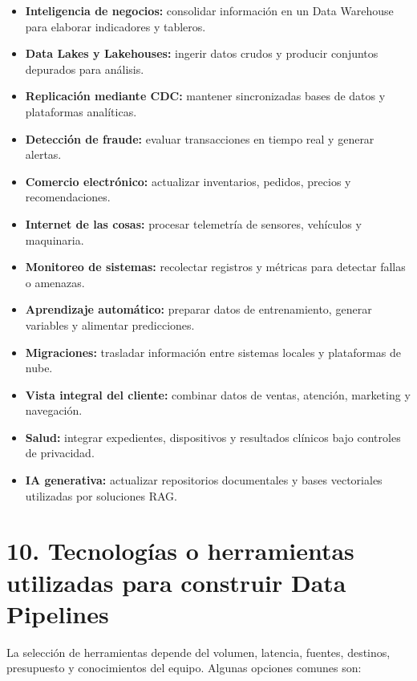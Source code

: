 \begin{itemize}
    \item \textbf{Inteligencia de negocios:} consolidar información en un Data Warehouse para elaborar indicadores y tableros.
    \item \textbf{Data Lakes y Lakehouses:} ingerir datos crudos y producir conjuntos depurados para análisis.
    \item \textbf{Replicación mediante CDC:} mantener sincronizadas bases de datos y plataformas analíticas.
    \item \textbf{Detección de fraude:} evaluar transacciones en tiempo real y generar alertas.
    \item \textbf{Comercio electrónico:} actualizar inventarios, pedidos, precios y recomendaciones.
    \item \textbf{Internet de las cosas:} procesar telemetría de sensores, vehículos y maquinaria.
    \item \textbf{Monitoreo de sistemas:} recolectar registros y métricas para detectar fallas o amenazas.
    \item \textbf{Aprendizaje automático:} preparar datos de entrenamiento, generar variables y alimentar predicciones.
    \item \textbf{Migraciones:} trasladar información entre sistemas locales y plataformas de nube.
    \item \textbf{Vista integral del cliente:} combinar datos de ventas, atención, marketing y navegación.
    \item \textbf{Salud:} integrar expedientes, dispositivos y resultados clínicos bajo controles de privacidad.
    \item \textbf{IA generativa:} actualizar repositorios documentales y bases vectoriales utilizadas por soluciones RAG.
\end{itemize}

\section*{10. Tecnologías o herramientas utilizadas para construir Data Pipelines}

La selección de herramientas depende del volumen, latencia, fuentes, destinos,
presupuesto y conocimientos del equipo. Algunas opciones comunes son:

